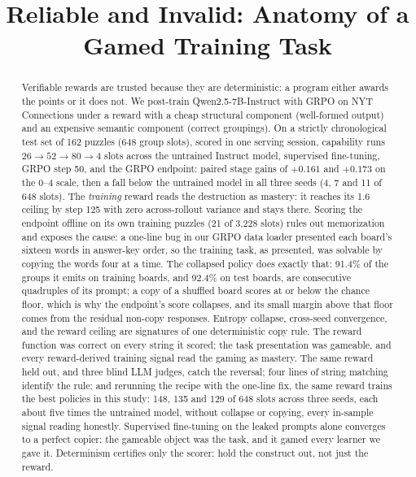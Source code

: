 \documentclass{article}
\title{Reliable and Invalid: Anatomy of a Gamed Training Task}
\begin{document}
\maketitle

\begin{abstract}
Verifiable rewards are trusted because they are deterministic: a program
either awards the points or it does not. We post-train Qwen2.5-7B-Instruct
with GRPO on NYT Connections under a reward with a cheap structural component
(well-formed output) and an expensive semantic component (correct
groupings). On a strictly chronological test set of 162 puzzles (648 group
slots), scored in one serving session, capability runs $26 \rightarrow 52
\rightarrow 80 \rightarrow 4$ slots across the untrained Instruct model,
supervised fine-tuning, GRPO step 50, and the GRPO endpoint: paired stage
gains of $+0.161$ and $+0.173$ on the
0--4 scale, then a fall below the untrained model in all three seeds (4, 7 and 11 of 648 slots). The \emph{training} reward reads the
destruction as mastery: it reaches its 1.6 ceiling by step 125 with zero
across-rollout variance and stays there. Scoring the endpoint offline on
its own training puzzles (21 of 3{,}228 slots) rules out memorization
and exposes the cause: a one-line bug in our GRPO data loader presented
each board's sixteen words in answer-key order, so the training task, as
presented, was solvable by copying the words four at a time. The collapsed policy does exactly that: 91.4\% of the groups it emits on training boards, and 92.4\% on test boards, are consecutive quadruples of its prompt; a copy of a shuffled board scores at or below the chance floor, which is why the endpoint's score collapses, and its small margin above that floor comes from the residual non-copy responses. Entropy collapse, cross-seed convergence, and the reward ceiling are signatures of one deterministic copy rule. The reward function was correct
on every string it scored; the task presentation was gameable, and every
reward-derived training signal read the gaming as mastery. The same reward held out, and three blind LLM judges, catch the reversal; four lines of string matching identify the rule; and rerunning the recipe with the one-line fix, the same reward trains the best policies in this study: 148, 135 and 129 of 648 slots across three seeds, each about five times the untrained model, without collapse or copying, every in-sample signal reading honestly. Supervised fine-tuning on the leaked prompts alone converges to a perfect copier: the gameable object was the task, and it gamed every learner we gave it. Determinism certifies only the scorer: hold the construct out, not just the reward.
\end{abstract}
\end{document}
